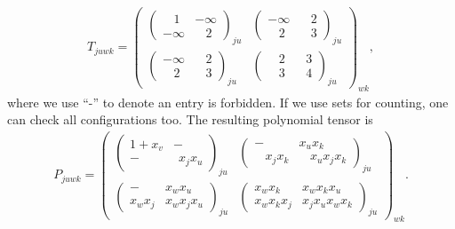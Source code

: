 \documentclass[review,onefignum,onetabnum]{siamart190516}
\newcommand{\<}{\langle}
\renewcommand{\>}{\rangle}
\begin{document}
\begin{align}
    T_{juwk} = \left(\begin{matrix}
        \left(\begin{matrix}
        ~~~~1 & -\infty \\
        -\infty & ~~~~2
        \end{matrix}\right)_{ju}&
        \left(\begin{matrix}
        -\infty & ~~~~2 \\
        ~~~~2 & ~~~~3
        \end{matrix}\right)_{ju}\\
        \left(\begin{matrix}
        -\infty & ~~~~2 \\
        ~~~~2 & ~~~~3
        \end{matrix}\right)_{ju} &
        \left(\begin{matrix}
        ~~~~2 & ~~~~3 \\
        ~~~~3 & ~~~~4
        \end{matrix}\right)_{ju}
    \end{matrix}\right)_{wk},
\end{align}
where we use ``-'' to denote an entry is forbidden.
If we use sets for counting, one can check all configurations too. The resulting polynomial tensor is
\begin{align}
    P_{juwk} = \left(\begin{matrix}
        \left(\begin{matrix}
        1+x_v & - \\
        - & ~~x_jx_u
        \end{matrix}\right)_{ju}&
        \left(\begin{matrix}
        - & x_ux_k \\
        ~~~~x_jx_k & ~~~~x_ux_jx_k
        \end{matrix}\right)_{ju}\\
        \left(\begin{matrix}
        - & x_wx_u \\
        x_wx_j & x_wx_jx_u
        \end{matrix}\right)_{ju} &
        \left(\begin{matrix}
        x_wx_k & x_wx_kx_u \\
        x_wx_kx_j & x_jx_ux_wx_k
        \end{matrix}\right)_{ju}
    \end{matrix}\right)_{wk}.
\end{align}
\end{document}
